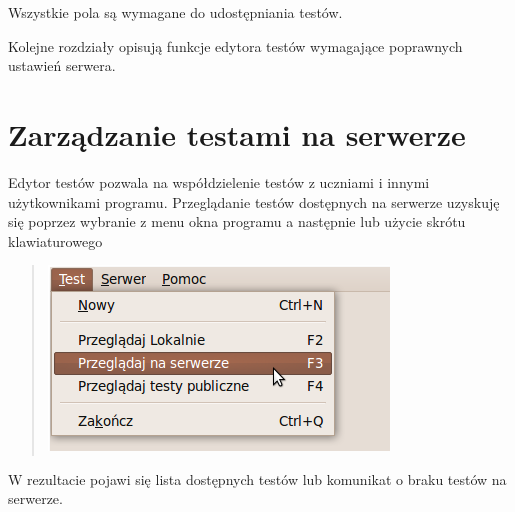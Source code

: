 \documentclass[letterpaper,10pt,polish]{sphinxmanual}
\begin{document}
Wszystkie pola są wymagane do udostępniania testów.

Kolejne rozdziały opisują funkcje edytora testów wymagające poprawnych ustawień serwera.


\section{Zarządzanie testami na serwerze}
\label{index:id7}\label{index:zarzadzanie-testami-na-serwerze}
Edytor testów pozwala na współdzielenie testów z uczniami i innymi użytkownikami programu. Przeglądanie testów dostępnych na serwerze uzyskuję się poprzez wybranie z menu okna programu  a następnie  lub użycie skrótu klawiaturowego 
\begin{quote}

\includegraphics{PrzegladajSerwer.png}
\end{quote}

W rezultacie pojawi się lista dostępnych testów lub komunikat o braku testów na serwerze.
\end{document}
